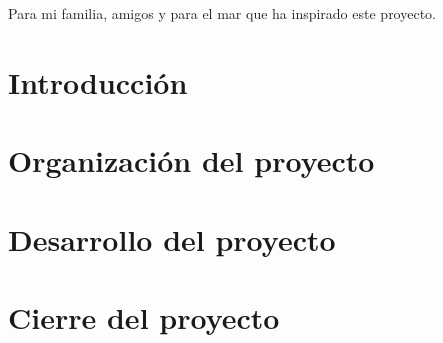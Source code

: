 \documentclass[titlepage,openright,twoside,a4paper,final,12pt,spanish]{book}
\author{Iván Fernández Limárquez}{Grado en Ingeniería Informática - Ingeniería del Software}{D.~}{77015962W}
\begin{document}
\makeTitlePage

\pagestyle{empty}
\begin{dedication}
Para mi familia, amigos y para el mar que ha inspirado este proyecto.
\end{dedication}
\pagestyle{trinidadPhD}




\tableofcontents
\listoffigures
\listoftables
\listoftodos
\newpage



\part{Introducción}



\part{Organización del proyecto}




\part{Desarrollo del proyecto}







\part{Cierre del proyecto}






\printglossaries
\newpage

\nocite{overleaftfg}


\end{document}
